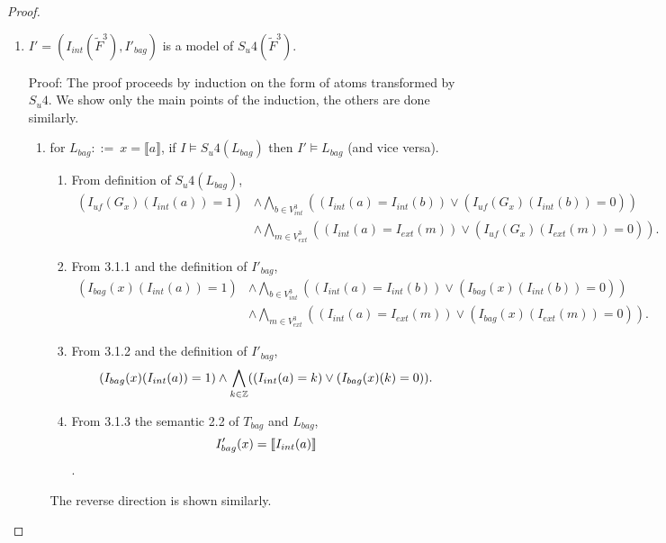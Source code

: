 \begin{proof}
\begin{enumerate}[1.]
Proof: By the fact that $I_{\textit{uf}}$ satisfies the constraint $F_3$, which means that values of $I_{\textit{uf}}(G_{x})(*) \ge 0$.

\item %
$I'=(I_{int}(\tilde{F}^3),I'_{bag})$ is a model of $S_{u}4(\tilde{F}^3)$.

Proof: The proof proceeds by induction on the form of atoms transformed by $S_{u}4$. We show only the main points of the induction, the others are done similarly.

\begin{enumerate}[3.1]
\item %
for $L_{bag} ::=\ x = \llbracket a \rrbracket$, if $I \models S_{u}4(L_{bag})$ then $I'\models L_{bag}$ (and vice versa). \\

\begin{enumerate}[3.1.1]
\item %
From definition of $S_{u}4(L_{bag})$,
\begin{align*}
(I_{\textit{uf}}(G_{x})(I_{int}(a)) = 1)  
&\land \underset{b\in V^3_{int}}{\bigwedge}((I_{int}(a) = I_{int}(b)) \lor (I_{\textit{uf}}(G_{x})(I_{int}(b)) = 0)) \\
&\land \underset{m\in V^3_{ext}}{\bigwedge}((I_{int}(a) = I_{ext}(m)) \lor (I_{\textit{uf}}(G_{x})(I_{ext}(m)) = 0)).
\end{align*}

\item %
From 3.1.1 and the definition of $I'_{bag}$,
\begin{align*}
(I_{bag}(x)(I_{int}(a)) = 1)  
&\land \underset{b\in V^3_{int}}{\bigwedge}((I_{int}(a) = I_{int}(b)) \lor (I_{bag}(x)(I_{int}(b)) = 0)) \\
&\land \underset{m\in V^3_{ext}}{\bigwedge}((I_{int}(a) = I_{ext}(m)) \lor (I_{bag}(x)(I_{ext}(m)) = 0)).
\end{align*}

\item %
From 3.1.2 and the definition of $I'_{bag}$,
$$(I_{bag}(x)(I_{int}(a)) = 1) \land \underset {k\in \mathbb{Z}}{\bigwedge}((I_{int}(a) = k) \lor (I_{bag}(x)(k) = 0)).$$

\item %
From 3.1.3 the semantic 2.2 of $T_{bag}$ and $L_{bag}$,
$$I'_{bag}(x) = \llbracket I_{int}(a) \rrbracket$$.

\end{enumerate}
The reverse direction is shown similarly.


\end{enumerate}
\end{enumerate}
\end{proof}
